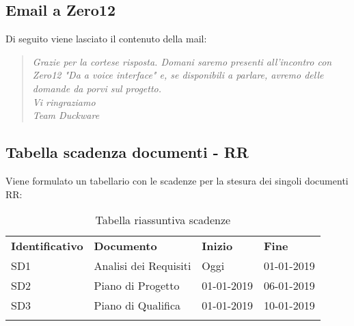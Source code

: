 	\subsection{Email a Zero12}
	Di seguito viene lasciato il contenuto della mail:
	\begin{quote}
		\textit{
	 	Grazie per la cortese risposta.
	 	Domani saremo presenti all'incontro con Zero12 "Da  a voice interface" e, se disponibili a parlare, avremo delle domande da porvi sul progetto.\\[0.5cm]
	 	Vi ringraziamo \\
	 	Team Duckware
	 	}
	\end{quote}
	\clearpage
	\subsection{Tabella scadenza documenti - RR}
	Viene formulato un tabellario con le scadenze per la stesura dei singoli documenti RR:\\[0.5cm]
	
	\begin{center}
		\renewcommand{\arraystretch}{1.5}
		\begin{longtable}{  p{3cm} p{5cm} p{2cm} p{2cm} }
			\rowcolor{tableHeadYellow}
			\textbf{Identificativo}&\textbf{Documento}&\textbf{Inizio}&\textbf{Fine}\\
			SD1 & Analisi dei Requisiti & Oggi & 01-01-2019\\
			SD2 & Piano di Progetto & 01-01-2019 & 06-01-2019\\
			SD3 & Piano di Qualifica & 01-01-2019 & 10-01-2019\\
			\rowcolor{white}
			\caption{Tabella riassuntiva scadenze}
		\end{longtable}	
	\end{center}